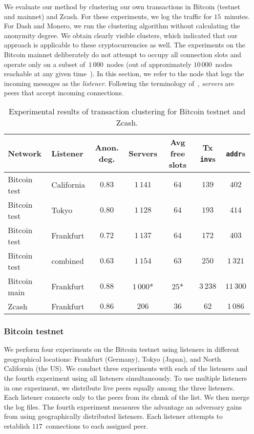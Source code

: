 We evaluate our method by clustering our own transactions in Bitcoin (testnet and mainnet) and Zcash.
For these experiments, we log the traffic for $15$~minutes.
For Dash and Monero, we run the clustering algorithm without calculating the anonymity degree.
We obtain clearly visible clusters, which indicated that our approach is applicable to these cryptocurrencies as well.
The experiments on the Bitcoin mainnet deliberately do not attempt to occupy all connection slots and operate only on a subset of~$1\,000$~nodes (out of approximately $10\,000$~nodes reachable at any given time~\cite{Bitnodes}).
In this section, we refer to the node that logs the incoming messages as the \textit{listener}.
Following the terminology of~\cite{Biryukov2014}, \textit{servers} are peers that accept incoming connections.

\begin{table*}[!t]
	\normalsize
	\caption{Experimental results of transaction clustering for Bitcoin testnet and Zcash.}
	\centering
	\begin{tabular}{|l|l|c|c|c|c|c|}
		\hline
		Network & Listener & Anon\@. deg. & Servers & Avg free slots & Tx \texttt{inv}s & \texttt{addr}s \\
		\hline
		Bitcoin test & California & $0.83$ & $1\,141$ & $64$ & $139$ & $402$ \\
		Bitcoin test & Tokyo & $0.80$ & $1\,128$ & $64$ & $193$ & $414$ \\
		Bitcoin test & Frankfurt & $0.72$ & $1\,137$ & $64$ & $172$ & $403$ \\
		Bitcoin test & combined & $0.63$ & $1\,154$ & $63$ & $250$ & $1\,321$ \\
		Bitcoin main & Frankfurt & $0.88$ & $1\,000$* & $25$* & $3\,238$ & $11\,300$ \\
		Zcash & Frankfurt & $0.86$ & $206$ & $36$ & $62$ & $1\,086$ \\
		\hline
	\end{tabular}
	\label{tab:results}
\end{table*}

\subsubsection{Bitcoin testnet}

We perform four experiments on the Bitcoin testnet using listeners in different geographical locations: Frankfurt (Germany), Tokyo (Japan), and North California (the US).
We conduct three experiments with each of the listeners and the fourth experiment using all listeners simultaneously.
To use multiple listeners in one experiment, we distribute live peers equally among the three listeners.
Each listener connects only to the peers from its chunk of the list.
We then merge the log files.
The fourth experiment measures the advantage an adversary gains from using geographically distributed listeners.
Each listener attempts to establish $117$~connections to each assigned peer.

